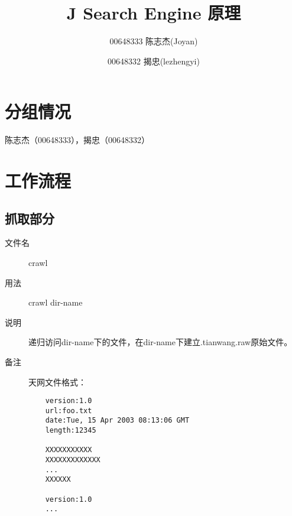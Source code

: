 \documentclass[14pt,a4paper]{article}
\title{J Search Engine 原理}
\author{00648333 陈志杰(Joyan) \and 00648332 揭忠(lezhengyi)}
\begin{document}
\maketitle        
\section{分组情况}
陈志杰（00648333），揭忠（00648332）
\section{工作流程}
\subsection{抓取部分}
\begin{description}
\item[文件名] crawl
\item[用法] crawl dir-name
\item[说明] 递归访问dir-name下的文件，在dir-name下建立.tianwang.raw原始文件。
\item[备注] 天网文件格式：\\
  \begin{lstlisting}
    version:1.0
    url:foo.txt
    date:Tue, 15 Apr 2003 08:13:06 GMT
    length:12345

    XXXXXXXXXXX
    XXXXXXXXXXXXX
    ...
    XXXXXX

    version:1.0
    ...
  \end{lstlisting}
\end{description}
\end{document}
